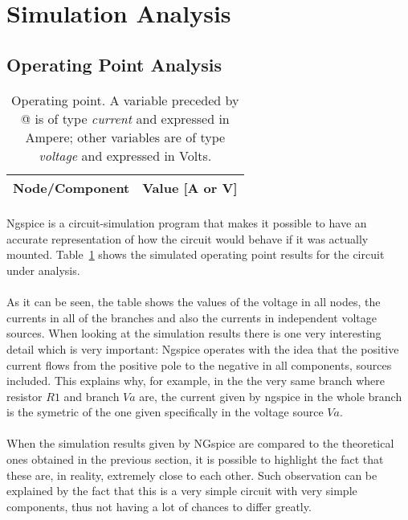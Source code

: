 \section{Simulation Analysis}
\label{sec:simulation}

\subsection{Operating Point Analysis}
\begin{table}[h]
  \centering
  \begin{tabular}{|l|r|}
    \hline    
    {\bf Node/Component} & {\bf Value [A or V]} \\ \hline
    
  \end{tabular}
  \caption{Operating point. A variable preceded by @ is of type {\em current}
    and expressed in Ampere; other variables are of type {\it voltage} and expressed in
    Volts.}
  \label{tab:op}
\end{table}



\paragraph{}Ngspice is a circuit-simulation program that makes it possible to have an accurate representation of how the circuit would behave if it was actually mounted. Table~\ref{tab:op} shows the simulated operating point results for the circuit
under analysis.


\paragraph{}As it can be seen, the table shows the values of the voltage in all nodes, the currents in all of the branches and also the currents in independent voltage sources. When looking at the simulation results there is one very interesting detail which is very important: Ngspice operates with the idea that the positive current flows from the positive pole to the negative in all components, sources included. This explains why, for example, in the the very same branch where resistor $R1$ and branch $Va$ are, the current given by ngspice in the whole branch is the symetric of the one given specifically in the voltage source $Va$.


\paragraph{} When the simulation results given by NGspice are compared to the theoretical ones obtained in the previous section, it is possible to highlight the fact that these are, in reality, extremely close to each other. Such observation can be explained by the fact that this is a very simple circuit with very simple components, thus not having a lot of chances to differ greatly.

